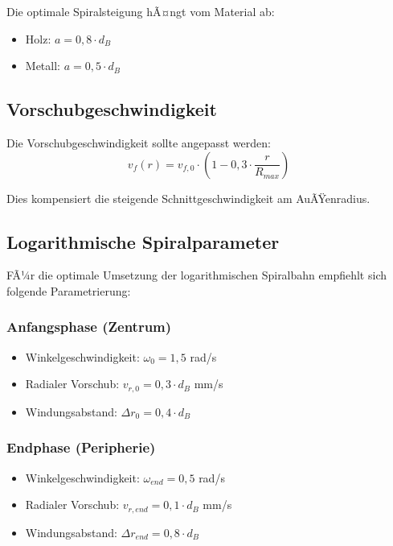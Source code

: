 ﻿\documentclass[12pt,a4paper]{article}
\begin{document}
Die optimale Spiralsteigung hÃ¤ngt vom Material ab:
\begin{itemize}
	\item Holz: $a = 0{,}8 \cdot d_B$
	\item Metall: $a = 0{,}5 \cdot d_B$
\end{itemize}

\subsection{Vorschubgeschwindigkeit}

Die Vorschubgeschwindigkeit sollte angepasst werden:
\begin{equation}
	v_f(r) = v_{f,0} \cdot \left(1 - 0{,}3 \cdot \frac{r}{R_{max}}\right)
\end{equation}

Dies kompensiert die steigende Schnittgeschwindigkeit am AuÃŸenradius.

\subsection{Logarithmische Spiralparameter}

FÃ¼r die optimale Umsetzung der logarithmischen Spiralbahn empfiehlt sich folgende Parametrierung:

\subsubsection{Anfangsphase (Zentrum)}
\begin{itemize}
	\item Winkelgeschwindigkeit: $\omega_0 = 1{,}5$ rad/s
	\item Radialer Vorschub: $v_{r,0} = 0{,}3 \cdot d_B$ mm/s
	\item Windungsabstand: $\Delta r_0 = 0{,}4 \cdot d_B$
\end{itemize}

\subsubsection{Endphase (Peripherie)}
\begin{itemize}
	\item Winkelgeschwindigkeit: $\omega_{end} = 0{,}5$ rad/s
	\item Radialer Vorschub: $v_{r,end} = 0{,}1 \cdot d_B$ mm/s
	\item Windungsabstand: $\Delta r_{end} = 0{,}8 \cdot d_B$
\end{itemize}
\end{document}
